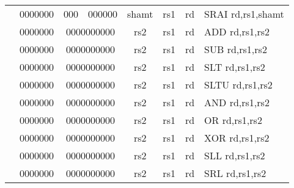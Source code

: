 \begin{table}[p]
\begin{small}
\begin{center}
\begin{tabular}{rcccccccccl}
&
\multicolumn{1}{|c|}{0000000} &
\multicolumn{2}{c|}{000} &
\multicolumn{2}{c|}{000000} &
\multicolumn{2}{c|}{shamt} &
\multicolumn{1}{c|}{rs1} &
\multicolumn{1}{c|}{rd} & SRAI rd,rs1,shamt \\
\cline{2-10}
  

&
\multicolumn{1}{|c|}{0000000} &
\multicolumn{5}{c|}{0000000000} &
\multicolumn{1}{c|}{rs2} &
\multicolumn{1}{c|}{rs1} &
\multicolumn{1}{c|}{rd} & ADD rd,rs1,rs2 \\
\cline{2-10}
  

&
\multicolumn{1}{|c|}{0000000} &
\multicolumn{5}{c|}{0000000000} &
\multicolumn{1}{c|}{rs2} &
\multicolumn{1}{c|}{rs1} &
\multicolumn{1}{c|}{rd} & SUB rd,rs1,rs2 \\
\cline{2-10}
  

&
\multicolumn{1}{|c|}{0000000} &
\multicolumn{5}{c|}{0000000000} &
\multicolumn{1}{c|}{rs2} &
\multicolumn{1}{c|}{rs1} &
\multicolumn{1}{c|}{rd} & SLT rd,rs1,rs2 \\
\cline{2-10}
  

&
\multicolumn{1}{|c|}{0000000} &
\multicolumn{5}{c|}{0000000000} &
\multicolumn{1}{c|}{rs2} &
\multicolumn{1}{c|}{rs1} &
\multicolumn{1}{c|}{rd} & SLTU rd,rs1,rs2 \\
\cline{2-10}
  

&
\multicolumn{1}{|c|}{0000000} &
\multicolumn{5}{c|}{0000000000} &
\multicolumn{1}{c|}{rs2} &
\multicolumn{1}{c|}{rs1} &
\multicolumn{1}{c|}{rd} & AND rd,rs1,rs2 \\
\cline{2-10}
  

&
\multicolumn{1}{|c|}{0000000} &
\multicolumn{5}{c|}{0000000000} &
\multicolumn{1}{c|}{rs2} &
\multicolumn{1}{c|}{rs1} &
\multicolumn{1}{c|}{rd} & OR rd,rs1,rs2 \\
\cline{2-10}
  

&
\multicolumn{1}{|c|}{0000000} &
\multicolumn{5}{c|}{0000000000} &
\multicolumn{1}{c|}{rs2} &
\multicolumn{1}{c|}{rs1} &
\multicolumn{1}{c|}{rd} & XOR rd,rs1,rs2 \\
\cline{2-10}
  

&
\multicolumn{1}{|c|}{0000000} &
\multicolumn{5}{c|}{0000000000} &
\multicolumn{1}{c|}{rs2} &
\multicolumn{1}{c|}{rs1} &
\multicolumn{1}{c|}{rd} & SLL rd,rs1,rs2 \\
\cline{2-10}
  

&
\multicolumn{1}{|c|}{0000000} &
\multicolumn{5}{c|}{0000000000} &
\multicolumn{1}{c|}{rs2} &
\multicolumn{1}{c|}{rs1} &
\multicolumn{1}{c|}{rd} & SRL rd,rs1,rs2 \\
\cline{2-10}
  


\end{tabular}
\end{center}
\end{small}
\end{table}
